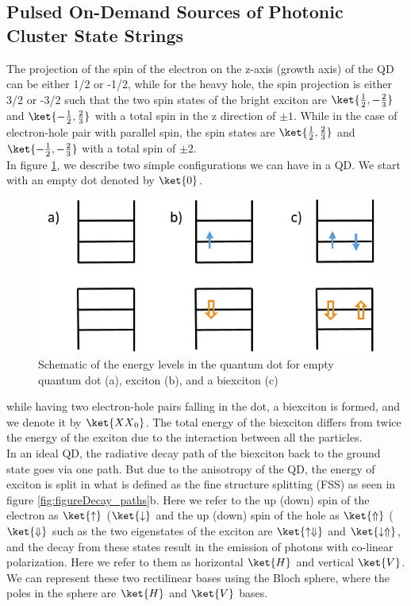 \subsection{Pulsed On-Demand Sources of Photonic Cluster State Strings }
	The projection of the spin of the electron on the z-axis (growth axis) of the QD can be either 1/2 or -1/2, while for the heavy hole, the spin 
 projection is either 3/2 or -3/2 such that the two spin states of the bright exciton are $\ket{\frac{1}{2},-\frac{2}{3}}$ and $\ket{-\frac{1}
 {2},\frac{2}{3}}$  with a total spin in the z direction  of $\pm1$. While in the case of electron-hole pair with parallel spin, the spin states are $\ket{\frac{1}{2},\frac{2}{3}}$ and $\ket{-\frac{1}{2},-\frac{2}{3}}$ with a total spin of $\pm2$.\\
	In figure \ref{fig:energy_levels}, we describe two simple configurations we can have in a QD. We start with an empty dot denoted by $\ket{0}$.
	\begin{figure}[H]
		\centering
		\includegraphics[scale=1]{figures/energy-levels.png}
		\caption{Schematic of the energy levels in the quantum dot for empty quantum dot (a), exciton (b), and a biexciton (c)}
		\label{fig:energy_levels}
	\end{figure}
	while having two electron-hole pairs falling in the dot, a biexciton is formed, and we denote it by $\ket{{XX}_0}$. The total energy of the biexciton differs from twice the energy of the exciton due to the interaction between all the particles.\\
	In an ideal QD, the radiative decay path of the biexciton back to the ground state goes via one path. But due to the anisotropy of the QD, the energy of exciton is split in what is defined as the fine structure splitting (FSS) as seen in figure \ref{fig:figureDecay_paths}b. Here we refer to the up (down) spin of the electron as $\ket{\uparrow}$ ($\ket{\downarrow}$ and the up (down) spin of the hole as $\ket{\Uparrow}$ ($\ket{\Downarrow}$ such as the two eigenstates of the exciton are  $\ket{\uparrow\Downarrow}$ and $\ket{\downarrow\Uparrow}$, and the decay from these states result in the emission of photons with co-linear polarization. Here we refer to them as horizontal $\ket{H}$ and vertical $\ket{V}$. We can represent these two rectilinear bases using the Bloch sphere, where the poles in the sphere are $\ket{H}$ and $\ket{V}$ bases.\\
	
